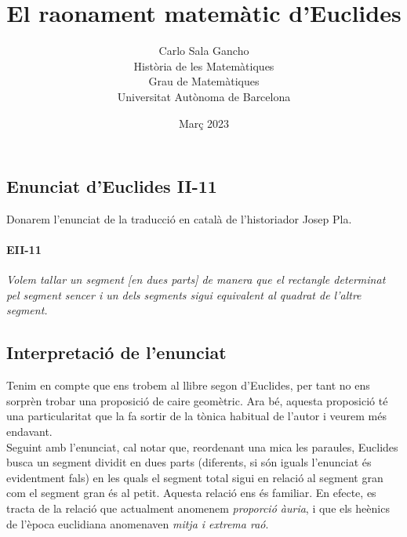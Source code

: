 \documentclass[a4paper, 11pt]{article}
\title{El raonament matemàtic d'Euclides}
\author{
  Carlo Sala Gancho\\
  Història de les Matemàtiques\\
  Grau de Matemàtiques\\
  Universitat Autònoma de Barcelona}
\date{Març 2023}
\begin{document}
\maketitle

\subsection*{Enunciat d'Euclides II-11}
Donarem l'enunciat de la traducció en català de l'historiador Josep Pla.
\paragraph*{EII-11} \textit{Volem tallar un segment [en dues parts] de manera que el rectangle determinat pel segment
  sencer i un dels segments sigui equivalent al quadrat de l'altre segment.}

\subsection*{Interpretació de l'enunciat}
Tenim en compte que ens trobem al llibre segon d'Euclides, per tant no ens sorprèn trobar una proposició de caire
geomètric. Ara bé, aquesta proposició té una particularitat que la fa sortir de la tònica habitual de l'autor i veurem
més endavant.\\
Seguint amb l'enunciat, cal notar que, reordenant una mica les paraules, Euclides busca un segment dividit en dues
parts (diferents, si són iguals l'enunciat és evidentment fals) en les quals el segment total sigui en relació al
segment gran com el segment gran és al petit\footnotemark. Aquesta relació ens és familiar. En efecte, es tracta de la
relació que actualment anomenem \textit{proporció àuria}, i que els he\lgem{}ènics de l'època euclidiana anomenaven
\textit{mitja i extrema raó}.

\end{document}
